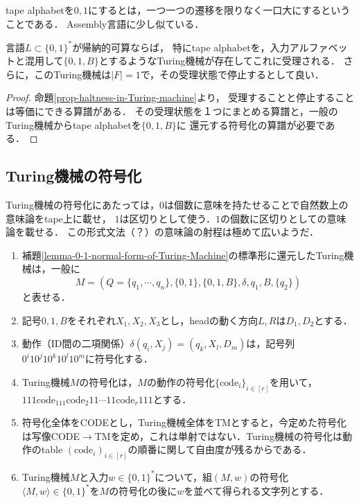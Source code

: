 \documentclass[uplatex, dvipdfmx]{jsreport}
\begin{document}
\begin{tcolorbox}[colframe=ForestGreen, colback=ForestGreen!10!white, breakable]
    tape alphabetを$0,1$にするとは，一つ一つの遷移を限りなく一口大にするということである．
    Assembly言語に少し似ている．
\end{tcolorbox}

\begin{lemma}\label{lemma-0-1-normal-form-of-Turing-Machine}
    言語$L\subset\{0,1\}^*$が帰納的可算ならば，
    特にtape alphabetを，入力アルファベットと混用して$\{0,1,B\}$とするようなTuring機械が存在してこれに受理される．
    さらに，このTuring機械は$|F|=1$で，その受理状態で停止するとして良い．
\end{lemma}
\begin{proof}
    命題\ref{prop-haltness-in-Turing-machine}より，
    受理することと停止することは等価にできる算譜がある．
    その受理状態を１つにまとめる算譜と，一般のTuring機械からtape alphabetを$\{0,1,B\}$に
    還元する符号化の算譜が必要である．
\end{proof}

\subsection{Turing機械の符号化}

\begin{tcolorbox}[colframe=ForestGreen, colback=ForestGreen!10!white, breakable]
    Turing機械の符号化にあたっては，$0$は個数に意味を持たせることで自然数上の意味論をtape上に載せ，
    $1$は区切りとして使う．$1$の個数に区切りとしての意味論を載せる．
    この形式文法（？）の意味論の射程は極めて広いようだ．
\end{tcolorbox}

\begin{definition}\mbox{}\label{def-encoding-of-Turing-machine}
    \begin{enumerate}
        \item 補題\ref{lemma-0-1-normal-form-of-Turing-Machine}の標準形に還元したTuring機械は，一般に
        \[M=(Q=\{q_1,\cdots,q_n\},\{0,1\},\{0,1,B\},\delta,q_1,B,\{q_2\})\]
        と表せる．
        \item 記号$0,1,B$をそれぞれ$X_1,X_2,X_3$とし，headの動く方向$L,R$は$D_1,D_2$とする．
        \item 動作（ID間の二項関係）$\delta(q_i,X_j)=(q_k,X_l,D_m)$は，記号列$0^i10^j10^k10^l10^m$に符号化する．
        \item Turing機械$M$の符号化は，$M$の動作の符号化$\{\mathrm{code}_i\}_{i\in[r]}$を用いて，$111\mathrm{code}_111\mathrm{code_2}11\cdots 11\mathrm{code}_r111$とする．
        \item 符号化全体をCODEとし，Turing機械全体をTMとすると，今定めた符号化は写像CODE$\to$TMを定め，これは単射ではない．Turing機械の符号化は動作のtable $(\mathrm{code}_i)_{i\in[r]}$の順番に関して自由度が残るからである．
        \item Turing機械$M$と入力$w\in\{0,1\}^*$について，組$(M,w)$の符号化$\langle M,w\rangle\in\{0,1\}^*$を$M$の符号化の後に$w$を並べて得られる文字列とする．
    \end{enumerate}
\end{definition}
\end{document}
